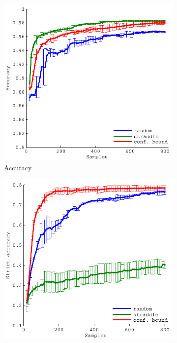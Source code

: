 \documentclass[11pt]{article} %
\begin{document}
\begin{figure}[h!]
  \begin{subfigure}[b]{0.329\textwidth}
    \centering
    \includegraphics[width=\textwidth]{figures/quake_acc}
    \caption{Accuracy}
  \end{subfigure}
  \hfill
  \begin{subfigure}[b]{0.329\textwidth}
    \centering
    \includegraphics[width=\textwidth]{figures/quake_strict_acc}

\end{subfigure}
\end{figure}
\end{document}
